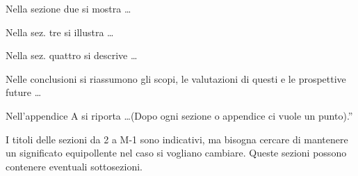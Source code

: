 Nella sezione due si mostra \dots

Nella sez. tre si illustra \dots

Nella sez. quattro si descrive \dots

Nelle conclusioni si riassumono gli scopi, le valutazioni di questi e le 
prospettive future \dots

Nell'appendice A si riporta \dots (Dopo ogni sezione o appendice ci vuole un 
punto).''

I titoli delle sezioni da 2 a M-1 sono indicativi, ma bisogna cercare di 
mantenere un significato equipollente nel caso si vogliano cambiare. Queste 
sezioni possono contenere eventuali sottosezioni.


